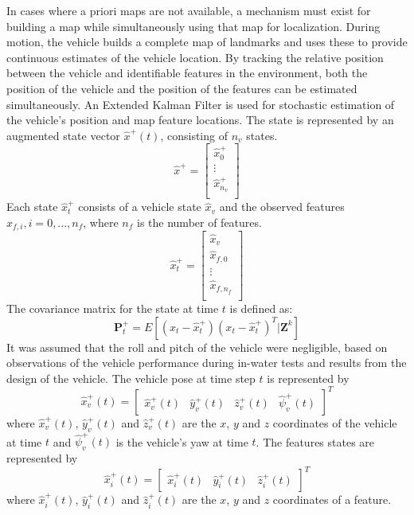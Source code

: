 In cases where a priori maps are not available, a mechanism must exist for building a map while simultaneously using that map for
localization.
During motion, the vehicle builds a complete map of landmarks and uses these to provide continuous estimates of the vehicle location.
By tracking the relative position between the vehicle and identifiable features in the environment, both the position of the vehicle and the position of the features can be estimated simultaneously.
An Extended Kalman Filter is used for stochastic estimation of the vehicle's position and map feature locations.
The state is represented by an augmented state vector $\hat{x}^{+}(t)$, consisting of $n_v$ states.
\begin{equation}
\hat{x}^+ = \left[ {
\begin{array}{c} \hat{x}_0^+ \\ \vdots \\ \hat{x}_{n_v}^+ \\  \end{array}
} \right]
\end{equation}
Each state $\hat{x}_t^+$ consists of a vehicle state $\hat{x}_v$ and the observed features $\hat{x}_{f, i}, i = 0, ..., n_f$, where $n_f$ is the number of features.
\begin{equation}
\hat{x}_t^+ = \left[ {
\begin{array}{c} \hat{x}_v \\ \hat{x}_{f, 0} \\ \vdots \\ \hat{x}_{f, n_f} \\  \end{array}
} \right]
\end{equation}
The covariance matrix for the state at time $t$ is defined as:
\begin{equation}
\textbf{P}^+_t = E[(x_t - \hat{x}^+_t)(x_t - \hat{x}^+_t)^T | \textbf{Z}^k]
\end{equation}
It was assumed that the roll and pitch of the vehicle were negligible, based on observations of the vehicle performance during in-water tests and results from the design of the vehicle.
The vehicle pose at time step $t$ is represented by
\begin{equation}
\hat{x}^+_v(t) = \left[ \begin{array}{cccc} \hat{\textit{x}}^+_v(t) & \hat{\textit{y}}^+_v(t) & \hat{\textit{z}}^+_v(t) & \hat{\psi}^+_v(t) \end{array}\right]^T
\end{equation}
where $\hat{\textit{x}}^+_v(t)$, $\hat{\textit{y}}^+_v(t)$ and $\hat{\textit{z}}^+_v(t)$ are the $x$, $y$ and $z$ coordinates of the vehicle at time $t$ and $\hat{\psi}^+_v(t)$ is the vehicle's yaw at time $t$.
The features states are represented by
\begin{equation}
\hat{x}^+_i(t) = \left[ \begin{array}{ccc} \hat{\textit{x}}^+_i(t) & \hat{\textit{y}}^+_i(t) & \hat{\textit{z}}^+_i(t) \end{array}\right]^T
\end{equation}
where $\hat{\textit{x}}^+_i(t)$, $\hat{\textit{y}}^+_i(t)$ and $\hat{\textit{z}}^+_i(t)$ are the $x$, $y$ and $z$ coordinates of a feature.

